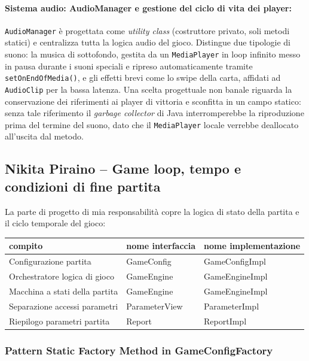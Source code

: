 \documentclass[11pt, a4paper, oneside]{report}
\begin{document}
\bigskip
\paragraph{Sistema audio: AudioManager e gestione del ciclo di vita dei player:}
\smallskip
\texttt{AudioManager} è progettata come \emph{utility class}
(costruttore privato, soli metodi statici) e centralizza tutta la
logica audio del gioco. Distingue due tipologie di suono: la musica
di sottofondo, gestita da un \texttt{MediaPlayer} in loop infinito
messo in pausa durante i suoni speciali e ripreso automaticamente
tramite \texttt{setOnEndOfMedia()}, e gli effetti brevi come lo swipe
della carta, affidati ad \texttt{AudioClip} per la bassa latenza.
Una scelta progettuale non banale riguarda la conservazione dei
riferimenti ai player di vittoria e sconfitta in un campo statico:
senza tale riferimento il \emph{garbage collector} di Java
interromperebbe la riproduzione prima del termine del suono, dato
che il \texttt{MediaPlayer} locale verrebbe deallocato all'uscita
dal metodo.

\subsection{Nikita Piraino -- Game loop, tempo e condizioni di fine partita}

La parte di progetto di mia responsabilità copre la logica di stato della partita e il ciclo temporale del gioco:

\begin{table}[h]
\centering
\begin{tabular}{|l|l|l|}
\hline
\textbf{compito} & \textbf{nome interfaccia} & \textbf{nome implementazione} \\ \hline
Configurazione partita & GameConfig & GameConfigImpl \\ \hline
Orchestratore logica di gioco & GameEngine & GameEngineImpl \\ \hline
Macchina a stati della partita & GameEngine & GameEngineImpl \\ \hline
Separazione accessi parametri & ParameterView & ParameterImpl \\ \hline
Riepilogo parametri partita & Report & ReportImpl \\ \hline
\end{tabular}
\end{table}

\subsubsection{Pattern Static Factory Method in GameConfigFactory}
\end{document}
